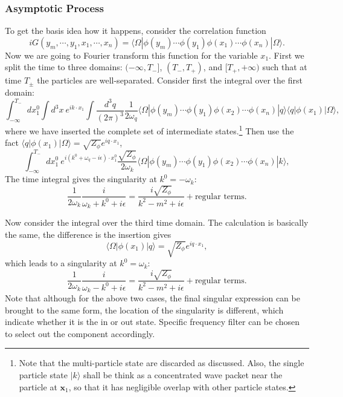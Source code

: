\documentclass[aps,prb,superscriptaddress,nofootinbib]{revtex4}
\begin{document}
\subsubsection{Asymptotic Process}
To get the basis idea how it happens, consider the correlation function
\begin{equation}
	iG(y_m,\cdots,y_1,x_1,\cdots,x_n) = \langle\Omega|\phi(y_m)\cdots\phi(y_1) \phi(x_1)\cdots\phi(x_n)|\Omega\rangle.
\end{equation}
Now we are going to Fourier transform this function for the variable $x_1$.
First we split the time to three domains: $(-\infty,T_-]$, $(T_-,T_+)$, and $[T_+,+\infty)$ such that at time $T_{\pm}$ the particles are well-separated.
Consider first the integral over the first domain:
\begin{equation}
	\int_{-\infty}^{T_-} dx_1^0 \int d^3 x\ e^{i k\cdot x_1} \int \frac{d^3q}{(2\pi)^3}\frac{1}{2\omega_q}\langle \Omega|\phi(y_m)\cdots\phi(y_1) \phi(x_2)\cdots\phi(x_n)|q\rangle \langle q|\phi(x_1) |\Omega\rangle,
\end{equation}
where we have inserted the complete set of intermediate states.\footnote{Note that the multi-particle state are discarded as discussed. Also, the single particle state $|k\rangle$ shall be think as a concentrated wave packet near the particle at $\bm x_1$, so that it has negligible overlap with other particle states.}
Then use the fact $\langle q|\phi(x_1)|\Omega\rangle = \sqrt{Z_\phi} e^{i q \cdot x_1}$, 
\begin{equation}
	\int_{-\infty}^{T_-} dx_1^0 \ e^{i (k^0+\omega_q-i\epsilon)\cdot x_1^0}\frac{\sqrt{Z_\phi}}{2\omega_k}\langle \Omega|\phi(y_m)\cdots\phi(y_1) \phi(x_2)\cdots\phi(x_n)|k\rangle,
\end{equation}
The time integral gives the singularity at $k^0=-\omega_k$:
\begin{equation}
	\frac{1}{2\omega_k} \frac{i}{\omega_k+k^0 + i\epsilon} = \frac{i\sqrt{Z_\phi}}{k^2-m^2+i\epsilon} + \text{regular terms}.
\end{equation}

Now consider the integral over the third time domain.
The calculation is basically the same, the difference is the insertion gives
\begin{equation*}
	\langle\Omega| \phi(x_1) |q\rangle = \sqrt{Z_\phi} e^{i q \cdot x_1},
\end{equation*}
which leads to a singularity at $k^0=\omega_k$:
\begin{equation}
	\frac{1}{2\omega_k} \frac{i}{\omega_k-k^0 + i\epsilon} = \frac{i\sqrt{Z_\phi}}{k^2-m^2+i\epsilon} + \text{regular terms}.
\end{equation}
Note that although for the above two cases, the final singular expression can be brought to the same form, the location of the singularity is different, which indicate whether it is the in or out state.
Specific frequency filter can be chosen to select out the component accordingly.
\end{document}
